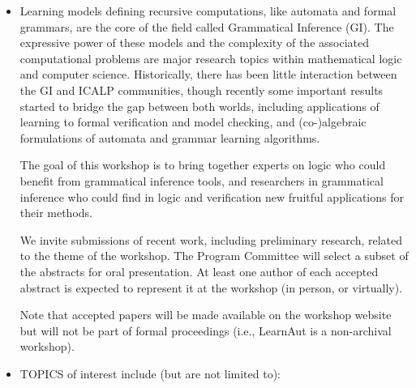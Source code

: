 \documentclass[prodmode,acmtecs]{acmsmall} %
\begin{document}
\begin{itemize}\item  Learning models defining recursive computations, like automata and formal grammars, are the core of the field called Grammatical Inference (GI). The expressive power of these models and the complexity of the associated computational problems are major research topics within mathematical logic and computer science. Historically, there has been little interaction between the GI and ICALP communities, though recently some important results started to bridge the gap between both worlds, including applications of learning to formal verification and model checking, and (co-)algebraic formulations of automata and grammar learning algorithms. 
 
  The goal of this workshop is to bring together experts on logic who could benefit from grammatical inference tools, and researchers in grammatical inference who could find in logic and verification new fruitful applications for their methods. 
 
  We invite submissions of recent work, including preliminary research, related to the theme of the workshop. The Program Committee will select a subset of the abstracts for oral presentation. At least one author of each accepted abstract is expected to represent it at the workshop (in person, or virtually).  
 
  Note that accepted papers will be made available on the workshop website but will not be part of formal proceedings (i.e., LearnAut is a non-archival workshop). 
 
\item  TOPICS of interest include (but are not limited to): 
 

\end{itemize}
\end{document}
